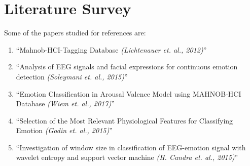 
\chapter{Literature Survey} %

\label{Chapter2} %


Some of the papers studied for references are:
\begin{enumerate}
\item ``Mahnob-HCI-Tagging Database \emph{(Lichtenauer et. al., 2012)}''\cite{mahnobDataset}
\item ``Analysis of EEG signals and facial expressions for continuous emotion detection \emph{(Soleymani et. al., 2015)}''\cite{mahnobEmo}
\item ``Emotion Classification in Arousal Valence Model using MAHNOB-HCI Database \emph{(Wiem et. al., 2017)}''\cite{wiem}
\item ``Selection of the Most Relevant Physiological Features for Classifying Emotion \emph{(Godin et. al., 2015)}''\cite{sel}
\item ``Investigation of window size in classification of EEG-emotion signal with wavelet entropy and support vector machine \emph{(H. {Candra} et. al., 2015)}''\cite{window}


\end{enumerate}
